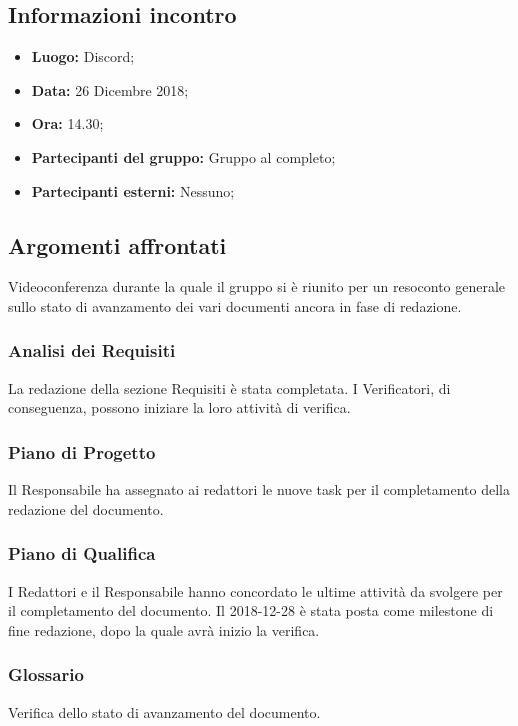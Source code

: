 \subsection{Informazioni incontro}
\begin{itemize}
	\item { \textbf{Luogo:} Discord;  }
	\item { \textbf{Data:} 26 Dicembre 2018; }
	\item { \textbf{Ora:} 14.30; }
	\item { \textbf{Partecipanti del gruppo:} Gruppo al completo; }
	\item { \textbf{Partecipanti esterni:} Nessuno; }
\end{itemize}


\subsection{Argomenti affrontati}
Videoconferenza durante la quale il gruppo si è riunito per un resoconto generale sullo stato di avanzamento dei vari documenti ancora in fase di redazione.

\subsubsection{Analisi dei Requisiti}
La redazione della sezione Requisiti è stata completata. I Verificatori, di conseguenza, possono iniziare la loro attività di verifica.  

\subsubsection{Piano di Progetto}
Il Responsabile ha assegnato ai redattori le nuove task per il completamento della redazione del documento.

\subsubsection{Piano di Qualifica}
I Redattori e il Responsabile hanno concordato le ultime attività da svolgere per il completamento del documento. Il 2018-12-28 è stata posta come milestone di fine redazione, dopo la quale avrà inizio la verifica.

\subsubsection{Glossario}
Verifica dello stato di avanzamento del documento.

